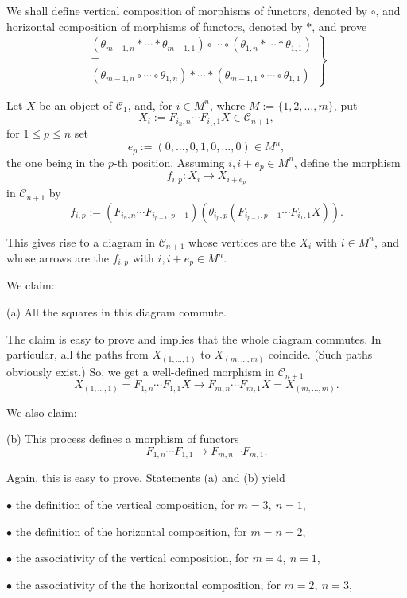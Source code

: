 \documentclass[12pt]{article}
\theoremstyle{remark}
\theoremstyle{definition}
\newcommand{\bu}{\bullet}
\newcommand{\C}{\mathcal C}
\begin{document}
We shall define vertical composition of morphisms of functors, denoted by $\circ$, and horizontal composition of morphisms of functors, denoted by $*$, and prove 
%
\begin{equation}\label{intlaw}%
\left.
\begin{matrix}
(\theta_{m-1,n}*\cdots*\theta_{m-1,1})\circ\cdots\circ(\theta_{1,n}*\cdots*\theta_{1,1})\\ 
=\\ 
(\theta_{m-1,n}\circ\cdots\circ\theta_{1,n})*\cdots*(\theta_{m-1,1}\circ\cdots\circ\theta_{1,1})
\end{matrix}
\right\}
\end{equation}

Let $X$ be an object of $\C_1$, and, for $i\in M^n$, where $M:=\{1,2,\dots,m\}$, put 
$$
X_i:=F_{i_n,n}\cdots F_{i_1,1}X\in\C_{n+1},
$$
for $1\le p\le n$ set 
$$
e_p:=(0,\dots,0,1,0,\dots,0)\in M^n,
$$
the one being in the $p$-th position. Assuming $i,i+e_p\in M^n$, define the morphism 
$$
f_{i,p}:X_i\to X_{i+e_p}
$$
in $\C_{n+1}$ by 
$$
f_{i,p}:=(F_{i_n,n}\cdots F_{i_{p+1},p+1})(\theta_{i_p,p}(F_{i_{p-1},p-1}\cdots F_{i_1,1}X)).
$$

This gives rise to a diagram in $\C_{n+1}$ whose vertices are the $X_i$ with $i\in M^n$, and whose arrows are the $f_{i,p}$ with $i,i+e_p\in M^n$. 

We claim: 

\noindent(a) All the squares in this diagram commute. 

The claim is easy to prove and implies that the whole diagram commutes. In particular, all the paths from $X_{(1,\dots,1)}$ to $X_{(m,\dots,m)}$ coincide. (Such paths obviously exist.) So, we get a well-defined morphism in $\C_{n+1}$
$$
X_{(1,\dots,1)}=F_{1,n}\cdots F_{1,1}X\to F_{m,n}\cdots F_{m,1}X=X_{(m,\dots,m)}.
$$

We also claim: 

\noindent(b) This process defines a morphism of functors 
$$
F_{1,n}\cdots F_{1,1}\to F_{m,n}\cdots F_{m,1}.
$$

Again, this is easy to prove. Statements (a) and (b) yield 

\noindent$\bu$ the definition of the vertical composition, for $m=3,\ n=1$,

\noindent$\bu$ the definition of the horizontal composition, for $m=n=2$,

\noindent$\bu$ the associativity of the vertical composition, for $m=4,\ n=1$,

\noindent$\bu$ the associativity of the the horizontal composition, for $m=2,\ n=3$,
\end{document}
